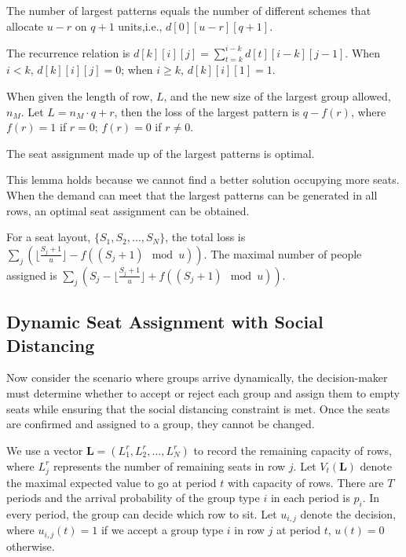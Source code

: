 The number of largest patterns equals the number of different schemes that allocate $u-r$ on $q+1$ units,i.e., $d[0][u-r][q+1]$.

The recurrence relation is $d[k][i][j] = \sum_{t=k}^{i-k} d[t][i-k][j-1]$. 
When $i < k$, $d[k][i][j] =0$; when $i \geq k$, $d[k][i][1] =1$.

\begin{lem}
When given the length of row, $L$, and the new size of the largest group allowed, $n_M$. Let $L = n_M \cdot q + r$, then the loss of the largest pattern is $q - f(r)$, where $f(r) =1$ if $r=0$; $f(r) =0$ if $r \neq 0$.
\end{lem}

\begin{lem}
The seat assignment made up of the largest patterns is optimal.
\end{lem}

This lemma holds because we cannot find a better solution occupying more seats. When the demand can meet that the largest patterns can be generated in all rows, an optimal seat assignment can be obtained.

\begin{prop}
For a seat layout, $\{S_1, S_2, \ldots, S_{N}\}$, the total loss is $\sum_{j} (\lfloor \frac{S_j+1}{u} \rfloor - f((S_j +1)\mod u))$. The maximal number of people assigned is $\sum_{j} (S_j - \lfloor \frac{S_j+1}{u} \rfloor + f((S_j +1)\mod u))$.
\end{prop}

\subsection{Dynamic Seat Assignment with Social Distancing}\label{sec_dynamic}


Now consider the scenario where groups arrive dynamically, the decision-maker must determine whether to accept or reject each group and assign them to empty seats while ensuring that the social distancing constraint is met. Once the seats are confirmed and assigned to a group, they cannot be changed.

We use a vector $\mathbf{L}= (L^{r}_1, L^{r}_2, \ldots, L^{r}_{N})$ to record the remaining capacity of rows, where $L^{r}_{j}$ represents the number of remaining seats in row $j$. Let $V_{t}(\mathbf{L})$ denote the maximal expected value to go at period $t$ with capacity of rows. There are $T$ periods and the arrival probability of the group type $i$ in each period is $p_i$. In every period, the group can decide which row to sit. Let $u_{i,j}$ denote the decision, where $u_{i,j}(t) = 1$ if we accept a group type $i$ in row $j$ at period $t$, $u(t) =0$ otherwise.


